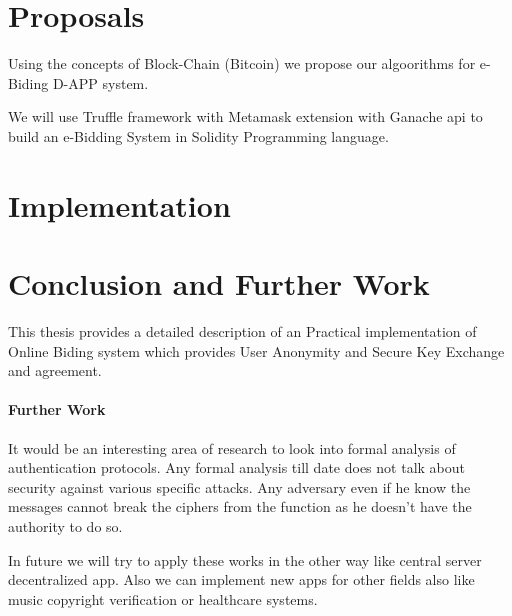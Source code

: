 \documentclass[a4paper,12pt]{report}
\begin{document}
\chapter{Proposals}
\label{Ch4} \setcounter{page}{1} 
\bigskip

Using the concepts of Block-Chain (Bitcoin) we propose our algoorithms for e-Biding D-APP system.

We will use Truffle framework with Metamask extension with Ganache api to build an e-Bidding System in Solidity Programming language.


\chapter{Implementation}
\label{Ch5} \setcounter{page}{1} 
\bigskip



\afterpage{\null\newpage}

\chapter{Conclusion and Further Work}
\label{Ch6} This thesis provides a detailed description of an
Practical implementation of Online Biding system which provides
User Anonymity and Secure Key Exchange and agreement.

\subsubsection{Further Work}
It would be an interesting area of research to look into formal
analysis of authentication protocols. Any formal analysis till date
does not talk about security against various specific attacks. Any adversary even if he know the messages cannot break the ciphers from the function as he doesn't
have the authority to do so.

In future we will try to apply these works in the other way like central server decentralized app.
Also we can implement new apps for other fields also like music copyright verification or healthcare systems.
\end{document}
